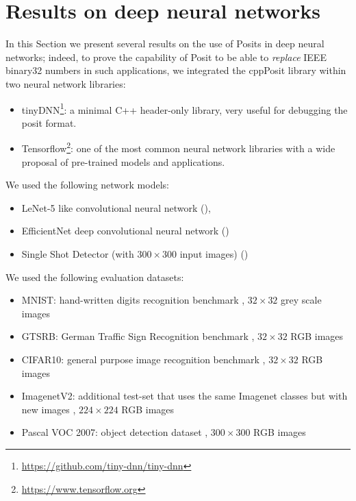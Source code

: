 \section{Results on deep neural networks}

In this Section we present several results on the use of Posits in deep neural networks; indeed, to prove the capability of Posit to be able to \textit{replace} IEEE binary32 numbers in such applications, we integrated the cppPosit library within two neural network libraries:
\begin{itemize}
    \item tinyDNN\footnote{\url{https://github.com/tiny-dnn/tiny-dnn}}: a minimal C++ header-only library, very useful for debugging the posit format.
    \item Tensorflow\footnote{\url{https://www.tensorflow.org}}: one of the most common neural network libraries with a wide proposal of pre-trained models and applications.
\end{itemize}

We used the following network models:
\begin{itemize}
    \item LeNet-5 like convolutional neural network (\cite{lecunlenet}), \
    \item EfficientNet deep convolutional neural network (\cite{tan2020efficientdet})
    \item Single Shot Detector (with $300\times 300$ input images) (\cite{Liu_2016})
\end{itemize}

We used the following evaluation datasets:
\begin{itemize}
    \item MNIST: hand-written digits recognition benchmark \cite{lecun-mnisthandwrittendigit-2010}, $32\times32$ grey scale images
    \item GTSRB: German Traffic Sign Recognition benchmark \cite{stallkamp2011gtrsb}, $32\times32$ RGB images
    \item CIFAR10: general purpose image recognition benchmark \cite{Krizhevsky09learningmultiple}, $32\times32$ RGB images
    \item ImagenetV2: additional test-set that uses the same Imagenet classes but with new images \cite{recht2019imagenet}, $224\times224$ RGB images
    \item Pascal VOC 2007: object detection dataset \cite{pascal-voc-2007}, $300\times300$ RGB images
\end{itemize}


